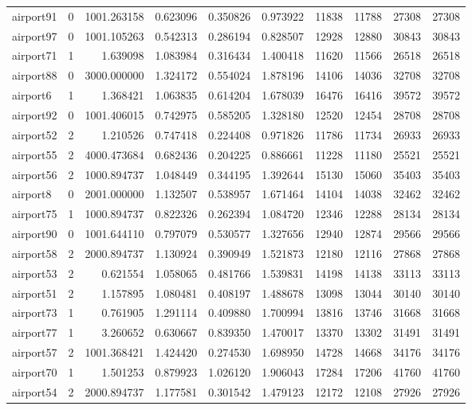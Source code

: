 \begin{longtable}{|l|r|r|r|r|r|r|r|r|r|}
airport91 & 0 & 1001.263158 & 0.623096 & 0.350826 & 0.973922 & 11838 & 11788 & 27308 & 27308 \\
airport97 & 0 & 1001.105263 & 0.542313 & 0.286194 & 0.828507 & 12928 & 12880 & 30843 & 30843 \\
airport71 & 1 & 1.639098 & 1.083984 & 0.316434 & 1.400418 & 11620 & 11566 & 26518 & 26518 \\
airport88 & 0 & 3000.000000 & 1.324172 & 0.554024 & 1.878196 & 14106 & 14036 & 32708 & 32708 \\
airport6 & 1 & 1.368421 & 1.063835 & 0.614204 & 1.678039 & 16476 & 16416 & 39572 & 39572 \\
airport92 & 0 & 1001.406015 & 0.742975 & 0.585205 & 1.328180 & 12520 & 12454 & 28708 & 28708 \\
airport52 & 2 & 1.210526 & 0.747418 & 0.224408 & 0.971826 & 11786 & 11734 & 26933 & 26933 \\
airport55 & 2 & 4000.473684 & 0.682436 & 0.204225 & 0.886661 & 11228 & 11180 & 25521 & 25521 \\
airport56 & 2 & 1000.894737 & 1.048449 & 0.344195 & 1.392644 & 15130 & 15060 & 35403 & 35403 \\
airport8 & 0 & 2001.000000 & 1.132507 & 0.538957 & 1.671464 & 14104 & 14038 & 32462 & 32462 \\
airport75 & 1 & 1000.894737 & 0.822326 & 0.262394 & 1.084720 & 12346 & 12288 & 28134 & 28134 \\
airport90 & 0 & 1001.644110 & 0.797079 & 0.530577 & 1.327656 & 12940 & 12874 & 29566 & 29566 \\
airport58 & 2 & 2000.894737 & 1.130924 & 0.390949 & 1.521873 & 12180 & 12116 & 27868 & 27868 \\
airport53 & 2 & 0.621554 & 1.058065 & 0.481766 & 1.539831 & 14198 & 14138 & 33113 & 33113 \\
airport51 & 2 & 1.157895 & 1.080481 & 0.408197 & 1.488678 & 13098 & 13044 & 30140 & 30140 \\
airport73 & 1 & 0.761905 & 1.291114 & 0.409880 & 1.700994 & 13816 & 13746 & 31668 & 31668 \\
airport77 & 1 & 3.260652 & 0.630667 & 0.839350 & 1.470017 & 13370 & 13302 & 31491 & 31491 \\
airport57 & 2 & 1001.368421 & 1.424420 & 0.274530 & 1.698950 & 14728 & 14668 & 34176 & 34176 \\
airport70 & 1 & 1.501253 & 0.879923 & 1.026120 & 1.906043 & 17284 & 17206 & 41760 & 41760 \\
airport54 & 2 & 2000.894737 & 1.177581 & 0.301542 & 1.479123 & 12172 & 12108 & 27926 & 27926 \\

\end{longtable}
